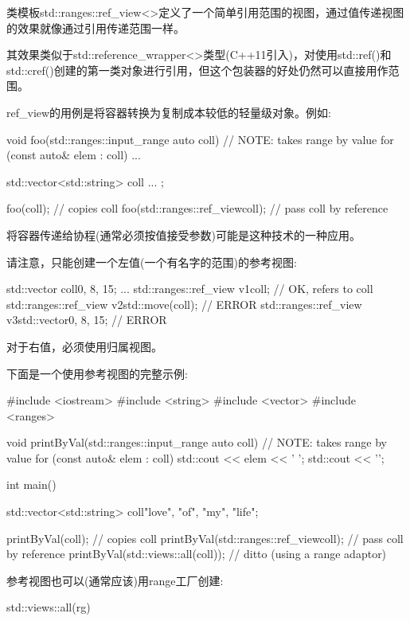 类模板std::ranges::ref\_view<>定义了一个简单引用范围的视图，通过值传递视图的效果就像通过引用传递范围一样。

其效果类似于std::reference\_wrapper<>类型(C++11引入)，对使用std::ref()和std::cref()创建的第一类对象进行引用，但这个包装器的好处仍然可以直接用作范围。

ref\_view的用例是将容器转换为复制成本较低的轻量级对象。例如:

\begin{cpp}
void foo(std::ranges::input_range auto coll) // NOTE: takes range by value
{
	for (const auto& elem : coll) {
		...
	}
}

std::vector<std::string> coll{ ... };

foo(coll); // copies coll
foo(std::ranges::ref_view{coll}); // pass coll by reference
\end{cpp}

将容器传递给协程(通常必须按值接受参数)可能是这种技术的一种应用。

请注意，只能创建一个左值(一个有名字的范围)的参考视图:

\begin{cpp}
std::vector coll{0, 8, 15};
...
std::ranges::ref_view v1{coll}; // OK, refers to coll
std::ranges::ref_view v2{std::move(coll)}; // ERROR
std::ranges::ref_view v3{std::vector{0, 8, 15}}; // ERROR
\end{cpp}

对于右值，必须使用归属视图。

下面是一个使用参考视图的完整示例:


\begin{cpp}
#include <iostream>
#include <string>
#include <vector>
#include <ranges>

void printByVal(std::ranges::input_range auto coll) // NOTE: takes range by value
{
	for (const auto& elem : coll) {
		std::cout << elem << ' ';
	}
	std::cout << '\n';
}

int main()
{
	std::vector<std::string> coll{"love", "of", "my", "life"};
	
	printByVal(coll); // copies coll
	printByVal(std::ranges::ref_view{coll}); // pass coll by reference
	printByVal(std::views::all(coll)); // ditto (using a range adaptor)
}
\end{cpp}


参考视图也可以(通常应该)用range工厂创建:

\begin{cpp}
std::views::all(rg)
\end{cpp}


